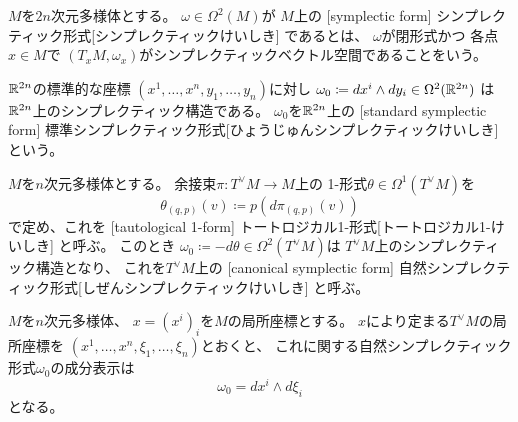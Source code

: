 \documentclass[report]{jlreq}
\begin{document}
\begin{definition}[シンプレクティック形式]
    $M$を$2n$次元多様体とする。
    $\omega \in \Omega^2(M)$が
    $M$上の
    [symplectic form]
        {シンプレクティック形式}[シンプレクティックけいしき]
    であるとは、
    $\omega$が閉形式かつ
    各点$x \in M$で
    $(T_x M, \omega_x)$がシンプレクティックベクトル空間であることをいう。
\end{definition}

\begin{example}[標準シンプレクティック形式]
    $\mathbb{R}^{2n}$の標準的な座標
    $(x^1, \ldots, x^n, y_1, \ldots, y_n)$に対し
    $\omega_0 \coloneqq dx^i \wedge dy_i \in \Omega^2(\mathbb{R}^{2n})$
    は$\mathbb{R}^{2n}$上のシンプレクティック構造である。
    $\omega_0$を$\mathbb{R}^{2n}$上の
    [standard symplectic form]
        {標準シンプレクティック形式}[ひょうじゅんシンプレクティックけいしき]
    という。
\end{example}

\begin{example}[余接束の自然シンプレクティック形式]
    $M$を$n$次元多様体とする。
    余接束$\pi \colon T^\vee M \to M$上の
    1-形式$\theta \in \Omega^1(T^\vee M)$を
    \begin{equation}
        \theta_{(q, p)} (v)
            \coloneqq
                p(d\pi_{(q, p)} (v))
    \end{equation}
    で定め、これを
    [tautological 1-form]
        {トートロジカル1-形式}[トートロジカル1-けいしき]
    と呼ぶ。
    このとき
    $\omega_0 \coloneqq -d\theta \in \Omega^2(T^\vee M)$は
    $T^\vee M$上のシンプレクティック構造となり、
    これを$T^\vee M$上の
    [canonical symplectic form]
        {自然シンプレクティック形式}[しぜんシンプレクティックけいしき]
    と呼ぶ。
\end{example}

\begin{proposition}[自然シンプレクティック形式の成分表示]
    $M$を$n$次元多様体、
    $x = (x^i)_i$を$M$の局所座標とする。
    $x$により定まる$T^\vee M$の局所座標を
    $(x^1, \dots, x^n, \xi_1, \dots, \xi_n)$とおくと、
    これに関する自然シンプレクティック形式$\omega_0$の成分表示は
    \begin{equation}
        \omega_0
            =
                dx^i \wedge d\xi_i
    \end{equation}
    となる。
\end{proposition}
\end{document}
